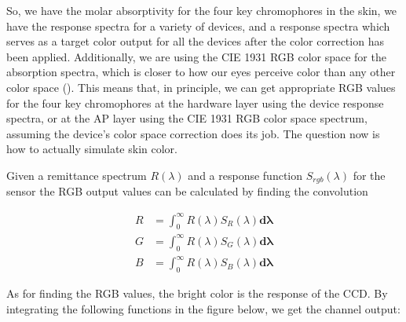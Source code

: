 So, we have the molar absorptivity for the four key chromophores in the skin, we have the response spectra for a variety of devices, and a response spectra which serves as a target color output for all the devices after the color correction has been applied. Additionally, we are using the CIE 1931 RGB color space for the absorption spectra, which is closer to how our eyes perceive color than any other color space (\cite{RIDI2013}). This means that, in principle, we can get appropriate RGB values for the four key chromophores at the hardware layer using the device response spectra, or at the AP layer using the CIE 1931 RGB color space spectrum, assuming the device's color space correction does its job. The question now is how to actually simulate skin color.

Given a remittance spectrum $R(\lambda)$ and a response function $S_{rgb}(\lambda)$ for the sensor the RGB output values can be calculated by finding the convolution 

\begin{align}
R & = \int_{0}^{\infty} R(\lambda) S_{R} (\lambda)  \mathbf{d\lambda}\\
G & = \int_{0}^{\infty} R(\lambda) S_{G} (\lambda) \mathbf{d\lambda}\\
B & = \int_{0}^{\infty} R(\lambda) S_{B} (\lambda)  \mathbf{d\lambda}
\end{align}

As for finding the RGB values, the bright color is the response of the CCD. By integrating the following functions in the figure below, we get the channel output:


